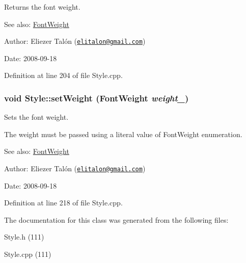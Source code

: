 Returns the font weight. 

\begin{Desc}
\item[See also:]\hyperlink{_font_weight_8h_ecff23ba4a68486421bcea57e095fe66}{FontWeight}\end{Desc}
\begin{Desc}
\item[Author:]Eliezer Talón (\href{mailto:elitalon@gmail.com}{\tt elitalon@gmail.com}) \end{Desc}
\begin{Desc}
\item[Date:]2008-09-18 \end{Desc}


Definition at line 204 of file Style.cpp.\hypertarget{class_style_75f1eaa59c2aff7c52df467c0d9157b1}{
\subsubsection[setWeight]{\setlength{\rightskip}{0pt plus 5cm}void Style::setWeight ({\bf FontWeight} {\em weight\_\-})}}
\label{class_style_75f1eaa59c2aff7c52df467c0d9157b1}


Sets the font weight. 

The weight must be passed using a literal value of FontWeight enumeration.

\begin{Desc}
\item[See also:]\hyperlink{_font_weight_8h_ecff23ba4a68486421bcea57e095fe66}{FontWeight}\end{Desc}
\begin{Desc}
\item[Author:]Eliezer Talón (\href{mailto:elitalon@gmail.com}{\tt elitalon@gmail.com}) \end{Desc}
\begin{Desc}
\item[Date:]2008-09-18 \end{Desc}


Definition at line 218 of file Style.cpp.

The documentation for this class was generated from the following files:\begin{CompactItemize}
\item 
Style.h (111)\item 
Style.cpp (111)\end{CompactItemize}
